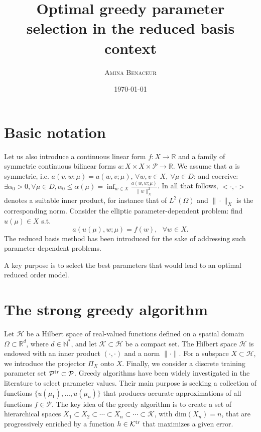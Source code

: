 \documentclass[12pt,a4paper]{article}
\title{ \bfseries \Huge {Optimal greedy parameter selection in the reduced basis context}}
\author{  \scshape  Amina Benaceur }
\date{\today}
\newcommand{\Ptr}{\mathcal P^{\rm tr}}
\newcommand{\N}{\mathbb N}
\newcommand{\calK}{\mathcal K}
\newcommand{\calH}{\mathcal H}
\newcommand{\calP}{\mathcal P}
\newcommand{\R}{\mathbb R}
\newcommand{\Ktr}{\calK^{\rm tr}}
\begin{document}
  \maketitle
  \section{Basic notation}
  Let us also introduce a continuous linear form $ f: X\rightarrow \mathbb{R}$ and a family of symmetric continuous bilinear forms  
  $ a: X\times X \times \mathcal P  \rightarrow \mathbb{R}$. We assume that $a$ is symmetric, i.e.
$a(v,w;\mu)=a(w,v;\mu)$, $\forall w,v \in X,\ \forall \mu \in D$; and coercive:
$\exists \alpha_{0}>0, \forall \mu \in D, \alpha_{0} \leq \alpha(\mu) = \inf_{w \in X}
\frac{a(w,w;\mu)}{\|w\|^{2}_{X}}$.
  In all that follows, $<\cdot,\cdot>$ denotes a suitable inner product, for instance that of $ L^2(\Omega)$
  and $\|\cdot\|_X$ is the corresponding norm. 
  Consider the elliptic parameter-dependent problem: find $u(\mu) \in X$ s.t.
  \begin{equation}\label{pde}
   a(u(\mu),w;\mu) = f(w),\ \ \ \forall w \in X.
  \end{equation}
The reduced basis method has been introduced for the sake of addressing such parameter-dependent problems.

A key purpose is to select the best parameters that would lead 
to an optimal reduced order model.

\section{The strong greedy algorithm}
Let $\calH$ be a Hilbert space of real-valued functions defined on a spatial domain $\Omega \subset \R^d$, where $d\in \N^*$, and let $\calK\subset\calH$ be a compact set. The Hilbert space $\calH$ is endowed with an inner product $(\cdot,\cdot)$ and a norm $\|\cdot\|$. For a subspace $X\subset\calH$, we introduce the projector $\Pi_X$ onto $X$.
Finally, we consider a discrete training parameter set $\Ptr\subset\calP$. Greedy algorithms have been widely investigated in the literature to select parameter values.
Their main purpose is seeking a collection of functions $\{u(\mu_1),\ldots,u(\mu_n)\}$ that produces accurate approximations of all functions $f\in\calP$. The key idea of the greedy algorithm is to create a set of hierarchical spaces
$X_1\subset X_2\subset\cdots\subset X_n\subset\cdots\subset \calK$, with $\mathrm{dim}(X_n) = n$, that are progressively enriched by a function $h\in\Ktr$ that maximizes a given error.
\end{document}
